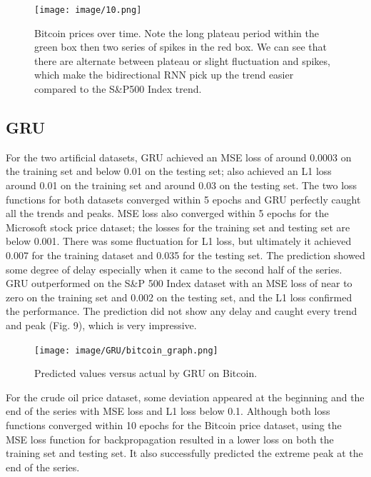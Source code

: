 \documentclass[letterpaper, 10 pt, conference]{ieeeconf}  %
\begin{document}
        
        \begin{figure}[thpb]
            \centering
            \texttt{[image: image/10.png]}
            \caption{Bitcoin prices over time. Note the long plateau period within the green box then two series of spikes in the red box. We can see that there are alternate between plateau or slight fluctuation and spikes, which make the bidirectional RNN pick up the trend easier compared to the S\&P500 Index trend.}
            \label{figurelabel}
        \end{figure}

    \subsection{GRU}

        For the two artificial datasets, GRU achieved an MSE loss of around 0.0003 on the training set and below 0.01 on the testing set; also achieved an L1 loss around 0.01 on the training set and around 0.03 on the testing set. The two loss functions for both datasets converged within 5 epochs and GRU perfectly caught all the trends and peaks. MSE loss also converged within 5 epochs for the Microsoft stock price dataset; the losses for the training set and testing set are below 0.001. There was some fluctuation for L1 loss, but ultimately it achieved 0.007 for the training dataset and 0.035 for the testing set. The prediction showed some degree of delay especially when it came to the second half of the series. GRU outperformed on the S\&P 500 Index dataset with an MSE loss of near to zero on the training set and 0.002 on the testing set, and the L1 loss confirmed the performance. The prediction did not show any delay and caught every trend and peak (Fig. 9), which is very impressive.

        \begin{figure}[h]
            \centering
            \texttt{[image: image/GRU/bitcoin\_graph.png]}
            \caption{Predicted values versus actual by GRU on Bitcoin.}
            \label{figurelabel}
        \end{figure}
        
        For the crude oil price dataset, some deviation appeared at the beginning and the end of the series with MSE loss and L1 loss below 0.1. Although both loss functions converged within 10 epochs for the Bitcoin price dataset, using the MSE loss function for backpropagation resulted in a lower loss on both the training set and testing set. It also successfully predicted the extreme peak at the end of the series.
\end{document}

